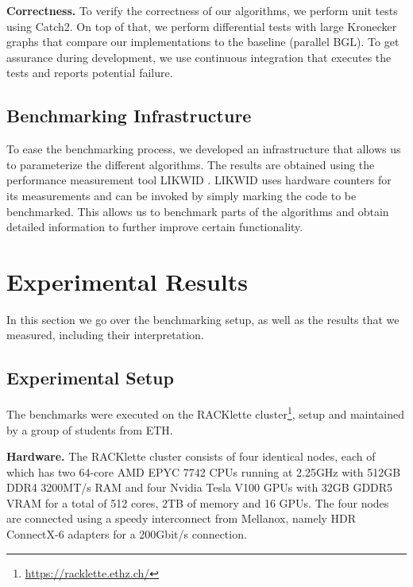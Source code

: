 \documentclass[letterpaper]{article}
\newcommand{\mypar}[1]{{\bf #1.}}
\begin{document}
\mypar{Correctness}
To verify the correctness of our algorithms, we perform unit tests using Catch2. On top of that, we perform differential
tests with large Kronecker graphs that compare our implementations to the baseline (parallel BGL). To get assurance
during development, we use continuous integration that executes the tests and reports potential failure.

\subsection{Benchmarking Infrastructure}
To ease the benchmarking process, we developed an infrastructure that allows us to parameterize the different
algorithms. The results are obtained using the performance measurement tool LIKWID \cite{treibig2010likwid}. LIKWID uses
hardware counters for its measurements and can be invoked by simply marking the code to be benchmarked. This allows us
to benchmark parts of the algorithms and obtain detailed information to further improve certain functionality.

\section{Experimental Results}
\label{sec:exp}
In this section we go over the benchmarking setup, as well as the results that we measured, including their
interpretation.

\subsection{Experimental Setup}
The benchmarks were executed on the RACKlette cluster\footnote{\url{https://racklette.ethz.ch/}}, setup and maintained
by a group of students from ETH.

\mypar{Hardware}
The RACKlette cluster consists of four identical nodes, each of which has two 64-core AMD EPYC 7742 CPUs running at
2.25GHz with 512GB DDR4 3200MT/s RAM and four Nvidia Tesla V100 GPUs with 32GB GDDR5 VRAM for a total of 512 cores, 2TB
of memory and 16 GPUs. The four nodes are connected using a speedy interconnect from Mellanox, namely HDR ConnectX-6
adapters for a 200Gbit/s connection.
\end{document}
